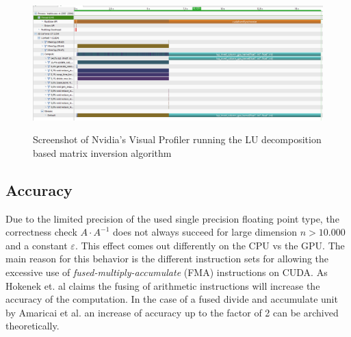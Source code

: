 \begin{figure}
	\includegraphics[width=18cm]{figs/nvprof.png}
	\centering
	\label{fig:nfprof}
	\caption{Screenshot of Nvidia's Visual Profiler running the LU decomposition based matrix inversion algorithm}
\end{figure}

\subsection*{Accuracy}
Due to the limited precision of the used single precision floating point type, the correctness check $A \cdot A^{-1}$ does not always succeed for large dimension $n > 10.000$ and a constant $\varepsilon$. This effect comes out differently on the CPU vs the GPU. The main reason for this behavior is the different instruction sets for allowing the excessive use of \emph{fused-multiply-accumulate} (FMA) instructions on CUDA. As Hokenek et. al \cite{Hokenek90} claims the fusing of arithmetic instructions will increase the accuracy of the computation. In the case of a fused divide and accumulate unit by Amaricai et al. \cite{Amaricai2010} an increase of accuracy up to the factor of 2 can be archived theoretically.
